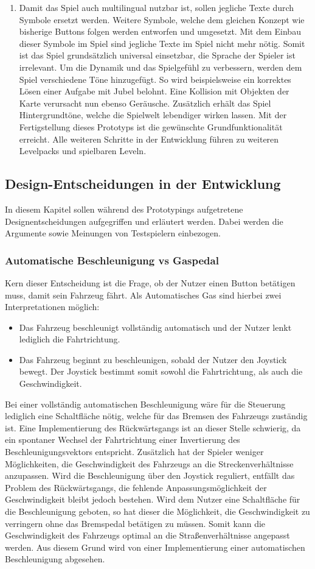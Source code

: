 \begin{enumerate}[label=Prototyp \arabic*]
		\item{ Damit das Spiel auch multilingual nutzbar ist, sollen jegliche Texte durch Symbole ersetzt werden. Weitere Symbole, welche dem gleichen Konzept wie bisherige Buttons folgen werden entworfen und umgesetzt. Mit dem Einbau dieser Symbole im Spiel sind jegliche Texte im Spiel nicht mehr nötig. Somit ist das Spiel grundsätzlich universal einsetzbar, die Sprache der Spieler ist irrelevant. Um die Dynamik und das Spielgefühl zu verbessern, werden dem Spiel verschiedene Töne hinzugefügt. So wird beispielsweise ein korrektes Lösen einer Aufgabe mit Jubel belohnt. Eine Kollision mit Objekten der Karte verursacht nun ebenso Geräusche. Zusätzlich erhält das Spiel Hintergrundtöne, welche die Spielwelt lebendiger wirken lassen. Mit der Fertigstellung dieses Prototyps ist die gewünschte Grundfunktionalität erreicht. Alle weiteren Schritte in der Entwicklung führen zu weiteren Levelpacks und spielbaren Leveln.}
	\end{enumerate}
\subsection{Design-Entscheidungen in der Entwicklung}
In diesem Kapitel sollen während des Prototypings aufgetretene Designentscheidungen aufgegriffen und erläutert werden. Dabei werden die Argumente sowie Meinungen von Testspielern einbezogen.
	\subsubsection{Automatische Beschleunigung vs Gaspedal}
	Kern dieser Entscheidung ist die Frage, ob der Nutzer einen Button betätigen muss, damit sein Fahrzeug fährt. Als Automatisches Gas sind hierbei zwei Interpretationen möglich:
	\begin{itemize}
	\item{ Das Fahrzeug beschleunigt vollständig automatisch und der Nutzer lenkt lediglich die Fahrtrichtung.}
	\item{ Das Fahrzeug beginnt zu beschleunigen, sobald der Nutzer den Joystick bewegt. Der Joystick bestimmt somit sowohl die Fahrtrichtung, als auch die Geschwindigkeit.}
	\end{itemize}
	Bei einer vollständig automatischen Beschleunigung wäre für die Steuerung lediglich eine Schaltfläche nötig, welche für das Bremsen des Fahrzeugs zuständig ist. Eine Implementierung des Rückwärtsgangs ist an dieser Stelle schwierig, da ein spontaner Wechsel der Fahrtrichtung einer Invertierung des Beschleunigungsvektors entspricht. Zusätzlich hat der Spieler weniger Möglichkeiten, die Geschwindigkeit des Fahrzeugs an die Streckenverhältnisse anzupassen. Wird die Beschleunigung über den Joystick reguliert, entfällt das Problem des Rückwärtsgangs, die fehlende Anpassungsmöglichkeit der Geschwindigkeit bleibt jedoch bestehen.
	Wird dem Nutzer eine Schaltfläche für die Beschleunigung geboten, so hat dieser die Möglichkeit, die Geschwindigkeit zu verringern ohne das Bremspedal betätigen zu müssen. Somit kann die Geschwindigkeit des Fahrzeugs optimal an die Straßenverhältnisse angepasst werden. Aus diesem Grund wird von einer Implementierung einer automatischen Beschleunigung abgesehen.

